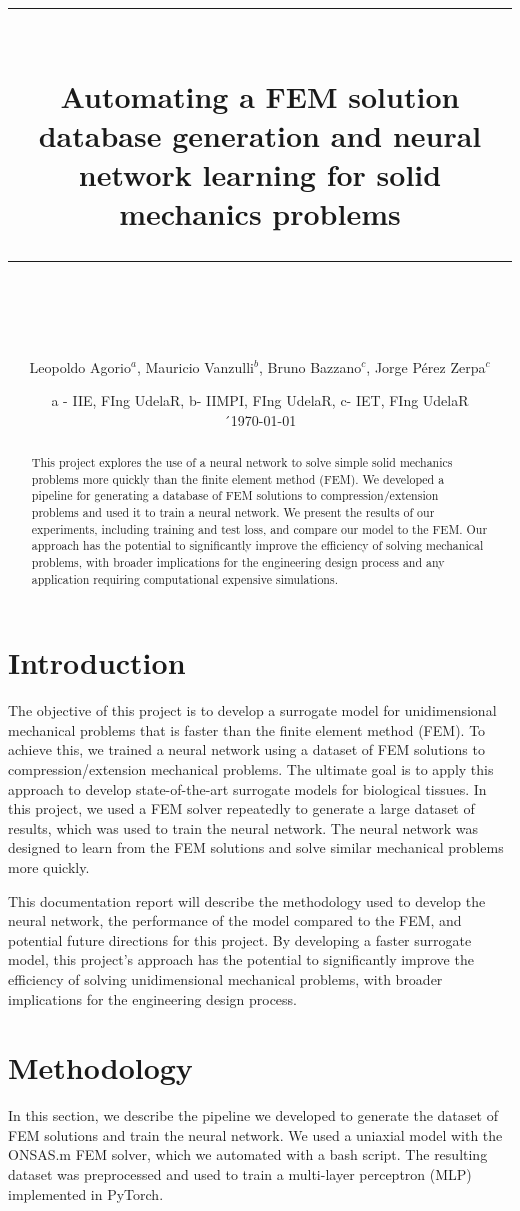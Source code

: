 \documentclass[11pt]{scrartcl} %
\title{	
	\normalfont\normalsize
	\textsc{}\\ %
	\vspace{25pt} %
	\rule{\linewidth}{0.5pt}\\ %
	\vspace{20pt} %
	{\huge Automating a FEM solution database generation and neural network learning for solid mechanics problems}\\ %
	\vspace{12pt} %
	\rule{\linewidth}{2pt}\\ %
	\vspace{12pt} %
}
\author{\Large Leopoldo Agorio$^a$, Mauricio Vanzulli$^b$, Bruno Bazzano$^c$, Jorge Pérez Zerpa$^c$} %
\date{\small{a - IIE, FIng UdelaR, b- IIMPI, FIng UdelaR, c- IET, FIng UdelaR}\\[3mm]´\normalsize\today} %
\begin{document}
\maketitle %


\begin{abstract}
	This project explores the use of a neural network to solve simple solid mechanics problems more quickly than the finite element method (FEM). We developed a pipeline for generating a database of FEM solutions to compression/extension problems and used it to train a neural network. We present the results of our experiments, including training and test loss, and compare our model to the FEM. Our approach has the potential to significantly improve the efficiency of solving mechanical problems, with broader implications for the engineering design process and any application requiring computational expensive simulations.
\end{abstract}
\section{Introduction}
The objective of this project is to develop a surrogate model for unidimensional mechanical problems that is faster than the finite element method (FEM). To achieve this, we trained a neural network using a dataset of FEM solutions to compression/extension mechanical problems. The ultimate goal is to apply this approach to develop state-of-the-art surrogate models for biological tissues. In this project, we used a FEM solver repeatedly to generate a large dataset of results, which was used to train the neural network. The neural network was designed to learn from the FEM solutions and solve similar mechanical problems more quickly.

This documentation report will describe the methodology used to develop the neural network, the performance of the model compared to the FEM, and potential future directions for this project. By developing a faster surrogate model, this project's approach has the potential to significantly improve the efficiency of solving unidimensional mechanical problems, with broader implications for the engineering design process.

\section{Methodology}
In this section, we describe the pipeline we developed to generate the dataset of FEM solutions and train the neural network. We used a uniaxial model with the ONSAS.m FEM solver, which we automated with a bash script. The resulting dataset was preprocessed and used to train a multi-layer perceptron (MLP) implemented in PyTorch.
\end{document}
